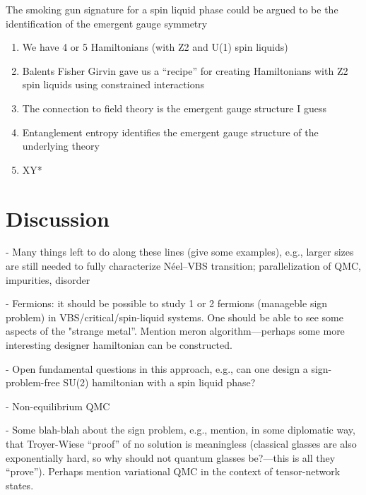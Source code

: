 \documentclass[aps,prb,groupedaddress,twocolumn]{revtex4}
\begin{document}
The smoking gun signature for a spin liquid phase could be argued to be the identification of the emergent gauge symmetry


\begin{enumerate}
\item We have 4 or 5 Hamiltonians (with Z2 \cite{Isakov1} and U(1) spin liquids)
\item Balents Fisher Girvin gave us a ``recipe'' for creating Hamiltonians with Z2 spin liquids using constrained interactions
\item The connection to field theory is the emergent gauge structure I guess
\item Entanglement entropy identifies the emergent gauge structure of the underlying theory
\item XY*
\end{enumerate}

\section{Discussion}
- Many things left to do along these lines (give some examples), e.g., larger sizes are still needed
to fully characterize N\'eel--VBS transition; parallelization of QMC, impurities, disorder

- Fermions: it should be possible to study 1 or 2 fermions (manageble sign problem) in 
VBS/critical/spin-liquid systems. One should be able to see some aspects of the "strange metal''.
Mention meron algorithm---perhaps some more interesting designer hamiltonian can be constructed.

- Open fundamental questions in this approach, e.g., can one design a sign-problem-free
  SU(2) hamiltonian with a spin liquid phase?

- Non-equilibrium QMC

- Some blah-blah about the sign problem, e.g., mention, in some diplomatic way, that Troyer-Wiese ``proof'' of no 
solution is meaningless (classical glasses are also exponentially hard, so why should not quantum glasses be?---this
is all they ``prove''). Perhaps mention variational QMC in the context of tensor-network states.


\end{document}
